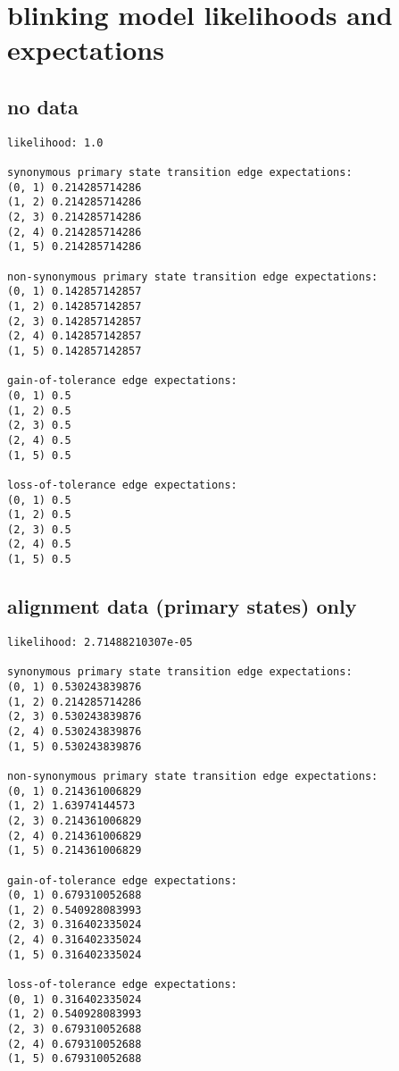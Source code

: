 \documentclass{article}
\begin{document}
\section{blinking model likelihoods and expectations}

\subsection{no data}
\begin{verbatim}
likelihood: 1.0

synonymous primary state transition edge expectations:
(0, 1) 0.214285714286
(1, 2) 0.214285714286
(2, 3) 0.214285714286
(2, 4) 0.214285714286
(1, 5) 0.214285714286

non-synonymous primary state transition edge expectations:
(0, 1) 0.142857142857
(1, 2) 0.142857142857
(2, 3) 0.142857142857
(2, 4) 0.142857142857
(1, 5) 0.142857142857

gain-of-tolerance edge expectations:
(0, 1) 0.5
(1, 2) 0.5
(2, 3) 0.5
(2, 4) 0.5
(1, 5) 0.5

loss-of-tolerance edge expectations:
(0, 1) 0.5
(1, 2) 0.5
(2, 3) 0.5
(2, 4) 0.5
(1, 5) 0.5
\end{verbatim}

\subsection{alignment data (primary states) only}
\begin{verbatim}
likelihood: 2.71488210307e-05

synonymous primary state transition edge expectations:
(0, 1) 0.530243839876
(1, 2) 0.214285714286
(2, 3) 0.530243839876
(2, 4) 0.530243839876
(1, 5) 0.530243839876

non-synonymous primary state transition edge expectations:
(0, 1) 0.214361006829
(1, 2) 1.63974144573
(2, 3) 0.214361006829
(2, 4) 0.214361006829
(1, 5) 0.214361006829

gain-of-tolerance edge expectations:
(0, 1) 0.679310052688
(1, 2) 0.540928083993
(2, 3) 0.316402335024
(2, 4) 0.316402335024
(1, 5) 0.316402335024

loss-of-tolerance edge expectations:
(0, 1) 0.316402335024
(1, 2) 0.540928083993
(2, 3) 0.679310052688
(2, 4) 0.679310052688
(1, 5) 0.679310052688
\end{verbatim}
\end{document}
